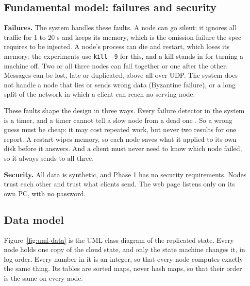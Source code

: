 \subsection{Fundamental model: failures and security}
\label{sec:fundamental}

\textbf{Failures.} The system handles these faults. A node can go silent: it ignores all traffic for 1 to 20 s and keeps its memory, which is the omission failure the spec requires to be injected. A node's process can die and restart, which loses its memory; the experiments use \texttt{kill -9} for this, and a kill stands in for turning a machine off. Two or all three nodes can fail together or one after the other. Messages can be lost, late or duplicated, above all over UDP. The system does not handle a node that lies or sends wrong data (Byzantine failure), or a long split of the network in which a client can reach no serving node.

These faults shape the design in three ways. Every failure detector in the system is a timer, and a timer cannot tell a slow node from a dead one \cite{chandra}. So a wrong guess must be cheap: it may cost repeated work, but never two results for one report. A restart wipes memory, so each node saves what it applied to its own disk before it answers. And a client must never need to know which node failed, so it always sends to all three.

\textbf{Security.} All data is synthetic, and Phase 1 has no security requirements. Nodes trust each other and trust what clients send. The web page listens only on its own PC, with no password.

\subsection{Data model}
\label{sec:datamodel}

Figure~\ref{fig:uml-data} is the UML class diagram of the replicated state. Every node holds one copy of the cloud state, and only the state machine changes it, in log order. Every number in it is an integer, so that every node computes exactly the same thing. Its tables are sorted maps, never hash maps, so that their order is the same on every node.

